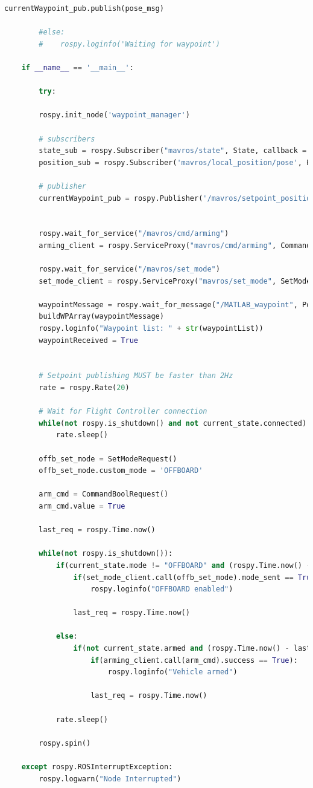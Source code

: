 \begin{lstlisting}[language=Python]
		currentWaypoint_pub.publish(pose_msg)
		
		#else:
		#    rospy.loginfo('Waiting for waypoint')
	
	if __name__ == '__main__':
	
		try:
		
		rospy.init_node('waypoint_manager')
		
		# subscribers
		state_sub = rospy.Subscriber("mavros/state", State, callback = state_cb)
		position_sub = rospy.Subscriber('mavros/local_position/pose', PoseStamped, callback = WP_callback)
		
		# publisher
		currentWaypoint_pub = rospy.Publisher('/mavros/setpoint_position/local', PoseStamped, queue_size=10)
		
		
		rospy.wait_for_service("/mavros/cmd/arming")
		arming_client = rospy.ServiceProxy("mavros/cmd/arming", CommandBool) 
		
		rospy.wait_for_service("/mavros/set_mode")
		set_mode_client = rospy.ServiceProxy("mavros/set_mode", SetMode)
		
		waypointMessage = rospy.wait_for_message("/MATLAB_waypoint", PoseArray)
		buildWPArray(waypointMessage)
		rospy.loginfo("Waypoint list: " + str(waypointList))
		waypointReceived = True    
	
	
		# Setpoint publishing MUST be faster than 2Hz
		rate = rospy.Rate(20)
		
		# Wait for Flight Controller connection
		while(not rospy.is_shutdown() and not current_state.connected):
			rate.sleep()
	
		offb_set_mode = SetModeRequest()
		offb_set_mode.custom_mode = 'OFFBOARD'
	
		arm_cmd = CommandBoolRequest()
		arm_cmd.value = True
		
		last_req = rospy.Time.now()
	
		while(not rospy.is_shutdown()):
			if(current_state.mode != "OFFBOARD" and (rospy.Time.now() - last_req) > rospy.Duration(5.0)):
				if(set_mode_client.call(offb_set_mode).mode_sent == True):
					rospy.loginfo("OFFBOARD enabled")
	
				last_req = rospy.Time.now()
				
			else:
				if(not current_state.armed and (rospy.Time.now() - last_req) > rospy.Duration(5.0)):
					if(arming_client.call(arm_cmd).success == True):
						rospy.loginfo("Vehicle armed")	
						
					last_req = rospy.Time.now()
	
			rate.sleep()
	
		rospy.spin()
	
	except rospy.ROSInterruptException:
		rospy.logwarn("Node Interrupted")
\end{lstlisting}

